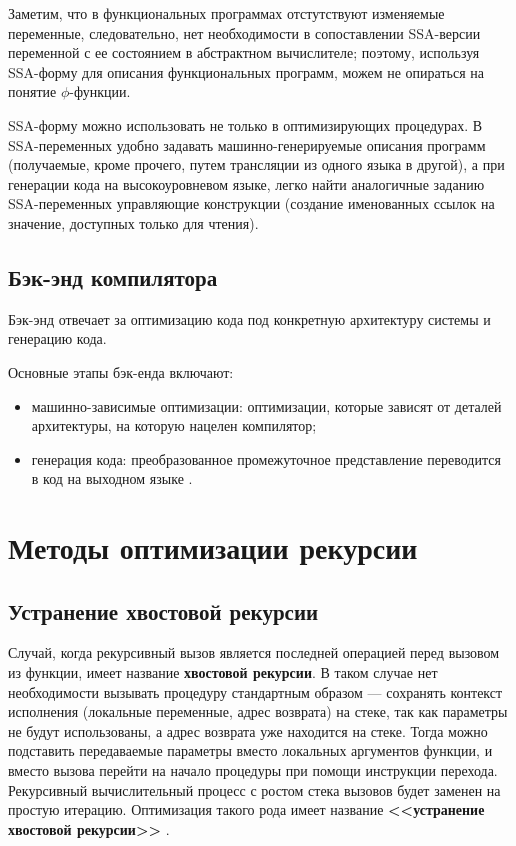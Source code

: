 Заметим, что в функциональных программах отстутствуют изменяемые переменные,
следовательно, нет необходимости в сопоставлении SSA-версии переменной с ее
состоянием в абстрактном вычислителе; поэтому, используя SSA-форму для
описания функциональных программ, можем не опираться на понятие $\phi$-функции.

SSA-форму можно использовать не только в оптимизирующих процедурах.
В SSA-переменных удобно задавать машинно-генерируемые
описания программ (получаемые, кроме прочего, путем трансляции из одного
языка в другой), а при генерации кода на высокоуровневом языке,
легко найти аналогичные заданию SSA-переменных управляющие конструкции
(создание именованных ссылок на значение, доступных только для чтения).

\subsection{Бэк-энд компилятора}\label{sec:ch1/sec5/subsec6}

Бэк-энд отвечает за оптимизацию кода под конкретную архитектуру системы
и генерацию кода. 

Основные этапы бэк-енда включают: 

\begin{itemize}
    \item машинно-зависимые оптимизации:
    оптимизации, которые зависят от деталей архитектуры, 
    на которую нацелен компилятор;
    \item генерация кода:
    преобразованное промежуточное представление переводится в код
    на выходном языке \cite[с.~619]{dragonbook}.
\end{itemize}

\section{Методы оптимизации рекурсии}\label{sec:ch1/sec7}

\subsection{Устранение хвостовой рекурсии}\label{sec:ch1/sec7/subsec1}

Случай, когда рекурсивный вызов является последней операцией перед
вызовом из функции, имеет название \textbf{хвостовой рекурсии}.
В таком случае нет необходимости вызывать процедуру стандартным образом
--- сохранять контекст исполнения (локальные переменные, адрес возврата)
на стеке, так как параметры не будут использованы, а адрес возврата
уже находится на стеке. Тогда можно подставить передаваемые параметры
вместо локальных аргументов функции, и вместо вызова перейти на начало
процедуры при помощи инструкции перехода. Рекурсивный вычислительный
процесс с ростом стека вызовов будет заменен на простую итерацию.
Оптимизация такого рода имеет название \textbf{<<устранение хвостовой
рекурсии>>} \cite[с.~508]{sicp}.

